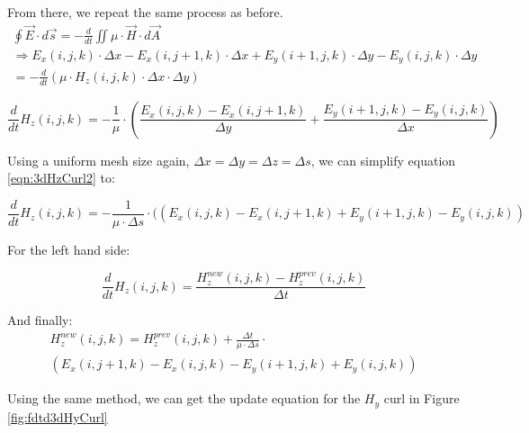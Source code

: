 From there, we repeat the same process as before.
\begin{multline}
	\label{eqn:3dHzCurl1}
	\oint \vec{E} \cdot d\vec{s} = - \frac{d}{dt} \iint \mu \cdot \vec{H} \cdot d\vec{A} \\
	\Rightarrow E_x(i,j,k) \cdot \Delta x - E_x(i,j+1,k) \cdot \Delta x + E_y(i+1,j,k) \cdot \Delta y - E_y(i,j,k) \cdot \Delta y \\ = -\frac{d}{dt}(\mu \cdot H_z(i,j,k) \cdot \Delta x \cdot \Delta y)
\end{multline}

\begin{equation}
	\label{eqn:3dHzCurl2}
	\frac{d}{dt} H_z(i,j,k) = -\frac{1}{\mu} \cdot (\frac{E_x(i,j,k) - E_x(i,j+1,k)}{\Delta y} + \frac{E_y(i+1,j,k)- E_y(i,j,k)}{\Delta x})
\end{equation}

Using a uniform mesh size again, $\Delta x = \Delta y =  \Delta z = \Delta s$, we can simplify equation \ref{eqn:3dHzCurl2} to:

\begin{equation}
	\label{eqn:3dHzCurl3}
	\frac{d}{dt} H_z(i,j,k) = -\frac{1}{\mu \cdot \Delta s} \cdot ((E_x(i,j,k) - E_x(i,j+1,k) + E_y(i+1,j,k)- E_y(i,j,k))
\end{equation}

For the left hand side:

\begin{equation}
	\label{eqn:3dHzCurl4}
	\frac{d}{dt} H_z(i,j,k) = \frac{H_z^{new}(i,j,k) - H_z^{prev}(i,j,k)}{\Delta t}
\end{equation}

And finally:
\begin{multline}
	\label{eqn:3dHzCurlFinal}
	H_z^{new}(i,j,k) =  H_z^{prev}(i,j,k) + \frac{\Delta t}{\mu \cdot \Delta s} \cdot \\ (E_x(i,j+1,k) - E_x(i,j,k) - E_y(i+1,j,k) + E_y(i,j,k))
\end{multline}

Using the same method, we can get the update equation for the $H_y$ curl in Figure \ref{fig:fdtd3dHyCurl}

